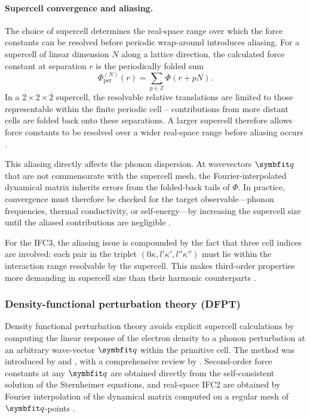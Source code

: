 \paragraph{Supercell convergence and aliasing.}
The choice of supercell determines the real-space range over which the
force constants can be resolved before periodic wrap-around introduces
aliasing.  For a supercell of linear dimension $N$ along a lattice
direction, the calculated force constant at separation $r$ is the
periodically folded sum
\begin{equation}\label{eq:fc_aliasing}
  \Phi_{\mathrm{per}}^{(N)}(r)
  = \sum_{p\in\mathbb{Z}} \Phi(r + pN).
\end{equation}
In a $2\times 2\times 2$ supercell, the resolvable relative
translations are limited to those representable within the finite
periodic cell -- contributions from more distant cells are folded back
onto these separations.  A larger supercell therefore allows force
constants to be resolved over a wider real-space range before aliasing
occurs \cite[Chs.~2,~6]{dove_introduction_1993}.

This aliasing directly affects the phonon dispersion. At wavevectors
$\vq$ that are not commensurate with the supercell mesh, the
Fourier-interpolated dynamical matrix inherits errors from the
folded-back tails of $\Phi$. In practice, convergence must therefore be
checked for the target observable---phonon frequencies, thermal
conductivity, or self-energy---by increasing the supercell size until
the aliased contributions are negligible
\cite{togo_first_2015, parlinski_first-principles_1997}.

For the IFC3, the aliasing issue is compounded by the fact that three
cell indices are involved: each pair in the triplet
$(0\kappa, l'\kappa', l''\kappa'')$ must lie within the
interaction range resolvable by the supercell.  This makes third-order
properties more demanding in supercell size than their harmonic
counterparts \cite{li_shengbte_2014, esfarjani_method_2008}.

\subsubsection{Density-functional perturbation theory (DFPT)}
\label{ssub:dfpt_fc}
Density functional perturbation theory avoids explicit supercell
calculations by computing the linear response of the electron density
to a phonon perturbation at an arbitrary wave-vector $\vq$ within the
primitive cell.  The method was introduced by
\citet{baroni_greens-function_1987} and
\citet{gonze_adiabatic_1995}, with a comprehensive review by
\citet{baroni_phonons_2001}.  Second-order force constants at any
$\vq$ are obtained directly from the self-consistent solution of the
Sternheimer equations, and real-space IFC2 are obtained by Fourier
interpolation of the dynamical matrix computed on a regular mesh of
$\vq$-points \cite{gonze_interatomic_1994}.

